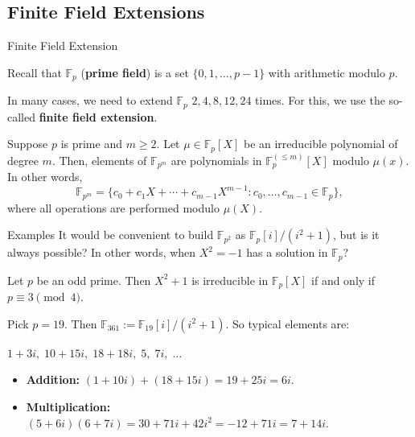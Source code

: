\documentclass{zkdl-presentation-template}
\begin{document}
    \subsection{Finite Field Extensions}

    \begin{frame}{Finite Field Extension}
        \begin{definition}
            Recall that $\mathbb{F}_p$ (\textbf{prime field}) is a set $\{0,1,\dots,p-1\}$ with arithmetic modulo $p$.
        \end{definition}

        In many cases, we need to extend $\mathbb{F}_p$ $2,4,8,12,24$ times. For this, we use the so-called \textbf{finite field extension}.

        \begin{definition}
            Suppose $p$ is prime and $m \geq 2$. Let $\mu \in \mathbb{F}_p[X]$ be an irreducible polynomial of degree $m$. Then, elements of $\mathbb{F}_{p^m}$ are polynomials in $\mathbb{F}_p^{(\leq m)}[X]$ modulo $\mu(x)$. In other words,
            \begin{equation*}
                \mathbb{F}_{p^m} = \{c_0+c_1X+\cdots+c_{m-1}X^{m-1}: c_0,\dots,c_{m-1} \in \mathbb{F}_p\},
            \end{equation*}
            where all operations are performed modulo $\mu(X)$.
        \end{definition}
    \end{frame}

    \begin{frame}{Examples}
        It would be convenient to build $\mathbb{F}_{p^2}$ as $\mathbb{F}_p[i]/(i^2+1)$, but is it always possible? In other words, when $X^2=-1$ has a solution in $\mathbb{F}_p$?
        \begin{theorem}
            Let $p$ be an odd prime. Then $X^2+1$ is irreducible in $\mathbb{F}_p[X]$ if and only if $p \equiv 3 \pmod{4}$.
        \end{theorem}

        \begin{example}
            Pick $p=19$. Then $\mathbb{F}_{361} := \mathbb{F}_{19}[i]/(i^2+1)$. So typical elements are:
            
            $1+3i, \; 10+15i, \; 18+18i, \; 5, \; 7i, \; \dots$
            
            \begin{itemize}
                \item \textbf{Addition:} $(1+10i)+(18+15i)= 19 + 25i = 6i$.
                \item \textbf{Multiplication:} $(5+6i)(6+7i)=30+71i+42i^2=-12+71i=7+14i$.
            \end{itemize}
        \end{example}
    \end{frame}
\end{document}
